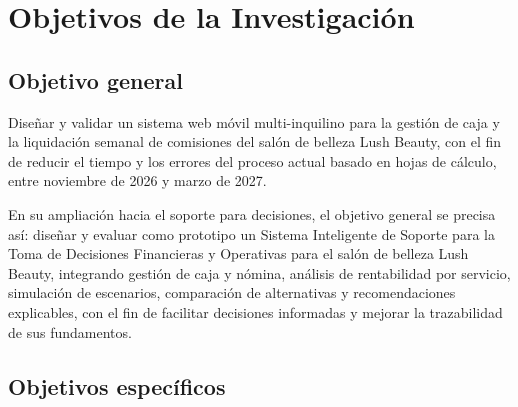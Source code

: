 \section{Objetivos de la Investigación}\label{cap:objetivos}

\subsection{Objetivo general}

Diseñar y validar un sistema web móvil multi-inquilino para la gestión de caja y la liquidación semanal de comisiones del salón de belleza Lush Beauty, con el fin de reducir el tiempo y los errores del proceso actual basado en hojas de cálculo, entre noviembre de 2026 y marzo de 2027.


En su ampliación hacia el soporte para decisiones, el objetivo general se precisa así: diseñar y evaluar como prototipo un Sistema Inteligente de Soporte para la Toma de Decisiones Financieras y Operativas para el salón de belleza Lush Beauty, integrando gestión de caja y nómina, análisis de rentabilidad por servicio, simulación de escenarios, comparación de alternativas y recomendaciones explicables, con el fin de facilitar decisiones informadas y mejorar la trazabilidad de sus fundamentos.

\subsection{Objetivos específicos}

